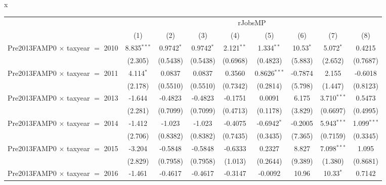 x
\begingroup
\centering
\begin{tabular}{lcccccccc}
   \toprule
    & \multicolumn{8}{c}{rJobsMP}\\
                                           & (1)           & (2)           & (3)           & (4)           & (5)            & (6)           & (7)           & (8)\\  
   \midrule 
   Pre2013FAMP0 $\times$ taxyear $=$ 2010  & 8.835$^{***}$ & 0.9742$^{*}$  & 0.9742$^{*}$  & 2.121$^{**}$  & 1.334$^{**}$   & 10.53$^{*}$   & 5.072$^{*}$   & 0.4215\\   
                                           & (2.305)       & (0.5438)      & (0.5438)      & (0.6968)      & (0.4823)       & (5.883)       & (2.652)       & (0.7687)\\   
   Pre2013FAMP0 $\times$ taxyear $=$ 2011  & 4.114$^{*}$   & 0.0837        & 0.0837        & 0.3560        & 0.8626$^{***}$ & -0.7874       & 2.155         & -0.6018\\   
                                           & (2.178)       & (0.5510)      & (0.5510)      & (0.7342)      & (0.2814)       & (5.798)       & (1.447)       & (0.8123)\\   
   Pre2013FAMP0 $\times$ taxyear $=$ 2013  & -1.644        & -0.4823       & -0.4823       & -0.1751       & 0.0091         & 6.175         & 3.710$^{***}$ & 0.5473\\   
                                           & (2.281)       & (0.7099)      & (0.7099)      & (0.4713)      & (0.1178)       & (3.829)       & (0.6697)      & (0.4995)\\   
   Pre2013FAMP0 $\times$ taxyear $=$ 2014  & -1.412        & -1.023        & -1.023        & -0.4075       & -0.6942$^{*}$  & -0.2005       & 5.943$^{***}$ & 1.099$^{***}$\\   
                                           & (2.706)       & (0.8382)      & (0.8382)      & (0.7435)      & (0.3435)       & (7.365)       & (0.7159)      & (0.3345)\\   
   Pre2013FAMP0 $\times$ taxyear $=$ 2015  & -3.204        & -0.5848       & -0.5848       & -0.6333       & 0.2327         & 8.827         & 7.098$^{***}$ & 1.095\\   
                                           & (2.829)       & (0.7958)      & (0.7958)      & (1.013)       & (0.2644)       & (9.389)       & (1.380)       & (0.8681)\\   
   Pre2013FAMP0 $\times$ taxyear $=$ 2016  & -1.461        & -0.4617       & -0.4617       & -0.3147       & -0.0092        & 10.96         & 10.33$^{*}$   & 0.7142\\   

\end{tabular}
